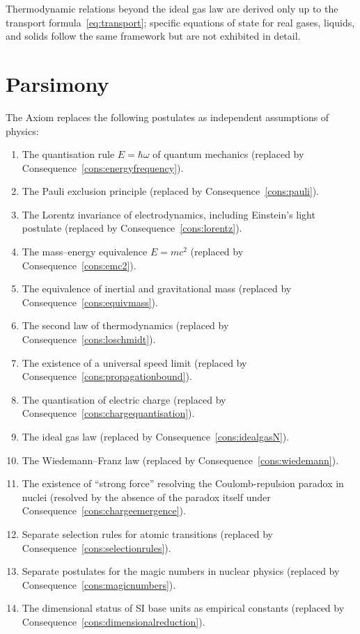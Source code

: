 \documentclass[11pt,twocolumn,a4paper]{article}
\theoremstyle{axiomstyle}
\theoremstyle{conseqstyle}
\theoremstyle{definition}
\theoremstyle{remark}
\begin{document}
Thermodynamic relations beyond the ideal gas law are derived only up to the transport formula~\eqref{eq:transport}; specific equations of state for real gases, liquids, and solids follow the same framework but are not exhibited in detail.

\section{Parsimony}
\label{sec:parsimony}

The Axiom replaces the following postulates as independent assumptions of physics:

\begin{enumerate}
\item The quantisation rule $E=\hbar\omega$ of quantum mechanics (replaced by Consequence~\ref{cons:energyfrequency}).
\item The Pauli exclusion principle (replaced by Consequence~\ref{cons:pauli}).
\item The Lorentz invariance of electrodynamics, including Einstein's light postulate (replaced by Consequence~\ref{cons:lorentz}).
\item The mass--energy equivalence $E=mc^{2}$ (replaced by Consequence~\ref{cons:emc2}).
\item The equivalence of inertial and gravitational mass (replaced by Consequence~\ref{cons:equivmass}).
\item The second law of thermodynamics (replaced by Consequence~\ref{cons:loschmidt}).
\item The existence of a universal speed limit (replaced by Consequence~\ref{cons:propagationbound}).
\item The quantisation of electric charge (replaced by Consequence~\ref{cons:chargequantisation}).
\item The ideal gas law (replaced by Consequence~\ref{cons:idealgasN}).
\item The Wiedemann--Franz law (replaced by Consequence~\ref{cons:wiedemann}).
\item The existence of ``strong force'' resolving the Coulomb-repulsion paradox in nuclei (resolved by the absence of the paradox itself under Consequence~\ref{cons:chargeemergence}).
\item Separate selection rules for atomic transitions (replaced by Consequence~\ref{cons:selectionrules}).
\item Separate postulates for the magic numbers in nuclear physics (replaced by Consequence~\ref{cons:magicnumbers}).
\item The dimensional status of SI base units as empirical constants (replaced by Consequence~\ref{cons:dimensionalreduction}).

\end{enumerate}
\end{document}
